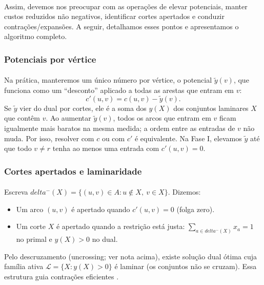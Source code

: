 \documentclass[12pt,a4paper]{article}
\def\emph#1{#1}%
\def\delta{delta}%
\begin{document}
\paragraph{}
Assim, devemos nos preocupar com as operações de elevar potenciais, manter custos reduzidos não negativos, identificar cortes apertados e conduzir contrações/expansões. A seguir, detalhamos esses pontos e apresentamos o algoritmo completo.

\subsubsection{Potenciais por vértice}
\paragraph{}
Na prática, manteremos um único número por vértice, o \emph{potencial} \(\tilde y(v)\), que funciona como um “desconto” aplicado a todas as arestas que entram em \(v\):
\[
    c'(u,v) = c(u,v) - \tilde y(v).
\]
Se \(\tilde y\) vier do dual por cortes, ele é a soma dos \(y(X)\) dos conjuntos laminares \(X\) que contêm \(v\). Ao aumentar \(\tilde y(v)\), todos os arcos que entram em \(v\) ficam igualmente mais baratos na mesma medida; a ordem entre as entradas de \(v\) não muda. Por isso, resolver com \(c\) ou com \(c'\) é equivalente. Na Fase I, elevamos \(\tilde y\) até que todo \(v\neq r\) tenha ao menos uma entrada com \(c'(u,v)=0\).

\subsubsection{Cortes apertados e laminaridade}
\paragraph{}
Escreva \(\delta^-(X)=\{(u,v)\in A: u\notin X,\ v\in X\}\). Dizemos:
\begin{itemize}\setlength{\itemsep}{1pt}
    \item Um arco \((u,v)\) é \emph{apertado} quando \(c'(u,v)=0\) (folga zero).
    \item Um corte \(X\) é \emph{apertado} quando a restrição está \emph{justa}: \(\sum_{a\in \delta^-(X)} x_a=1\) no primal e \(y(X)>0\) no dual.
\end{itemize}
Pelo descruzamento (\emph{uncrossing}; ver nota acima), existe solução dual ótima cuja família ativa \(\mathcal{L}=\{X: y(X)>0\}\) é \emph{laminar} (os conjuntos não se cruzam). Essa estrutura guia contrações eficientes \cite{frank2014,schrijver2003comb}.
\end{document}

